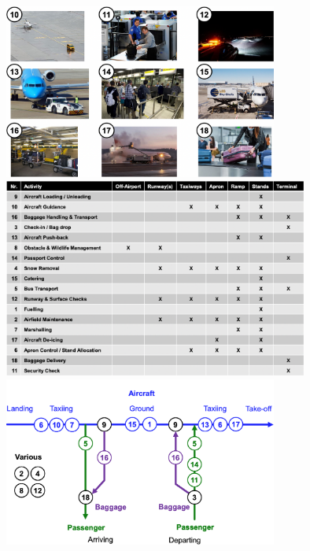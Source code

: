 \documentclass[9pt, landscape, fleqn]{scrartcl}
\begin{document}
\begin{multicols*}{3}
\begin{center}
\includegraphics[width=9cm]{Images/Designations2.png}
\includegraphics[width=10cm]{Images/Lists_of_Designations.png}
\includegraphics[width=9cm]{Images/Localisation_of_Designations.png}

\end{center}
\end{multicols*}
\end{document}
